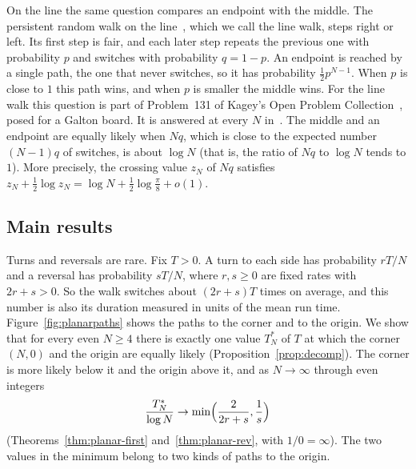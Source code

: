 On the line the same question compares an endpoint with the middle. The
persistent random walk on the line~\cite{goldstein1951,kac1974,renshawhenderson1981,paperA}, which we call the line walk,
steps right or left. Its first step is fair, and each later step repeats the
previous one with probability $p$ and switches with probability $q=1-p$. An
endpoint is reached by a single path, the one that never switches, so it has
probability $\frac12p^{N-1}$. When $p$ is close to $1$ this path wins, and when
$p$ is smaller the middle wins. For the line walk this question is part of
Problem~131 of Kagey's Open Problem Collection~\cite{kagey131}, posed for a
Galton board. It is answered at every $N$ in~\cite{paperA}. The middle and an
endpoint are equally likely when $Nq$, which is close to the expected number
$(N-1)q$ of switches, is about $\log N$ (that is, the ratio of $Nq$ to $\log N$
tends to $1$). More precisely, the crossing value $z_N$ of $Nq$ satisfies
$z_N+\frac12\log z_N=\log N+\frac12\log\frac\pi8+o(1)$.

\subsection{Main results}\label{sec:results}

Turns and reversals are rare. Fix $T>0$. A turn to each side has probability
$rT/N$ and a reversal has probability $sT/N$, where $r,s\ge0$ are fixed rates
with $2r+s>0$. So the walk switches about $(2r+s)T$ times on average, and this
number is also its duration measured in units of the mean run time. Figure~\ref{fig:planarpaths} shows the paths to the corner and
to the origin. We show that for every even $N\ge4$ there is exactly one value
$T^*_N$ of $T$ at which the corner $(N,0)$ and the origin are equally likely
(Proposition~\ref{prop:decomp}). The corner is more likely below it and the
origin above it, and as $N\to\infty$ through even integers
\begin{equation}\label{eq:intro-limit}
 \frac{T^*_N}{\log N}\to\min\Bigl(\frac2{2r+s},\frac1s\Bigr)
\end{equation}
(Theorems~\ref{thm:planar-first} and~\ref{thm:planar-rev}, with $1/0=\infty$). The two values in
the minimum belong to two kinds of paths to the origin.


